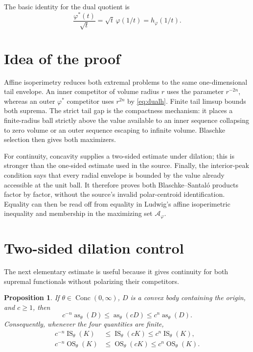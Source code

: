 \documentclass[11pt]{article}
\newtheorem{proposition}[theorem]{Proposition}
\newcommand{\as}{\operatorname{as}}
\newcommand{\IS}{\operatorname{IS}}
\newcommand{\OS}{\operatorname{OS}}
\begin{document}
The basic identity for the dual quotient is
\begin{equation}\label{eq:dualh}
 \frac{\varphi^*(t)}{\sqrt t}
 =\sqrt t\,\varphi(1/t)=h_\varphi(1/t).
\end{equation}

\section{\hspace{0.35em}Idea of the proof}

Affine isoperimetry reduces both extremal problems to the same
one-dimensional tail envelope.  An inner competitor of volume radius $r$
uses the parameter $r^{-2n}$, whereas an outer $\varphi^*$ competitor uses
$r^{2n}$ by \eqref{eq:dualh}.  Finite tail limsup bounds both suprema.  The
strict tail gap is the compactness mechanism: it places a finite-radius ball
strictly above the value available to an inner sequence collapsing to zero
volume or an outer sequence escaping to infinite volume.  Blaschke selection
then gives both maximizers.

For continuity, concavity supplies a two-sided estimate under dilation; this
is stronger than the one-sided estimate used in the source.  Finally, the
interior-peak condition says that every radial envelope is bounded by the
value already accessible at the unit ball.  It therefore proves both
Blaschke--Santal\'o products factor by factor, without the source's invalid
polar-centroid identification.  Equality can then be read off from equality
in Ludwig's affine isoperimetric inequality and membership in the maximizing
set $\mathcal A_\varphi$.

\section{Two-sided dilation control}

The next elementary estimate is useful because it gives continuity for both
supremal functionals without polarizing their competitors.

\begin{proposition}\label{prop:dilation}
If $\theta\in\operatorname{Conc}(0,\infty)$, $D$ is a convex body containing
the origin, and $c\geq1$, then
\begin{equation}\label{eq:dilation}
 c^{-n}\as_\theta(D)\leq\as_\theta(cD)\leq c^n\as_\theta(D).
\end{equation}
Consequently, whenever the four quantities are finite,
\begin{align}
 c^{-n}\IS_\theta(K)&\leq\IS_\theta(cK)\leq c^n\IS_\theta(K),
 \label{eq:dilationIS}\\
 c^{-n}\OS_\theta(K)&\leq\OS_\theta(cK)\leq c^n\OS_\theta(K).
 \label{eq:dilationOS}
\end{align}
\end{proposition}
\end{document}
